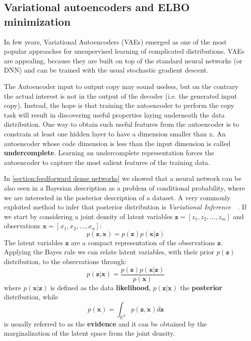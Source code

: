 \subsection{Variational autoencoders and ELBO minimization}
\label{section:VAE}

In few years, Variational Autoencoders (VAEs) emerged as one of the most popular approaches for unsupervised learning of complicated distributions. VAEs are appealing, because they are built on top of the standard neural networks (or DNN) and can be trained with the usual stochastic gradient descent.

The Autoencoder input to output copy may sound useless, but on the contrary the actual interest is not in the output of the decoder (i.e. the generated input copy). Instead, the hope is that training the autoencoder to perform the copy task will result in discovering useful properties laying underneath the data distribution. One way to obtain such useful features from the autoencoder is to constrain at least one hidden layer to have a dimension smaller than x. An autoencoder whose code dimension is less than the input dimension is called \textbf{undercomplete}. Learning an undercomplete representation forces the autoencoder to capture the most salient features of the training data.

In \cref{section:feedforward dense networks} we showed that a neural network can be also seen in a Bayesian description as a problem of conditional probability, where we are interested in the posterior description of a dataset. A very commonly exploited method to infer that posterior distribution is \textit{Variational Inference}~\cite{Jordan:1999:IVM:339248.339252}~\cite{MAL-001}.
If we start by considering a joint density of latent variables $\bm{z} = [z_1, z_2, ...,z_m]$ and observations $\bm{x} = [x_1, x_2, ..., x_n]$:
\begin{equation}
    p(\bm{z},\bm{x}) = p(\bm{z}) p(\bm{x}|\bm{z})
\end{equation}
The latent variables $\bm{z}$ are a compact representation of the observations $\bm{z}$. Applying the Bayes rule we can relate latent variables, with their prior $p(\bm{z})$ distribution, to the observations through:
\begin{equation}
    p(\bm{z}|\bm{x}) = \frac{p(\bm{z})p(\bm{x}|\bm{z})}{p(\bm{x})}
\end{equation}
where $p(\bm{x}|\bm{z})$ is defined as the data \textbf{likelihood}, $p(\bm{z}|\bm{x})$ the \textbf{posterior} distribution, while
\begin{equation}
    p(\bm{x}) = \int_{\mathbb{R}^Z} p(\bm{z}, \bm{x}) d\bm{z}
\end{equation}
is usually referred to as the \textbf{evidence} and it can be obtained by the marginalization of the latent space from the joint density.

